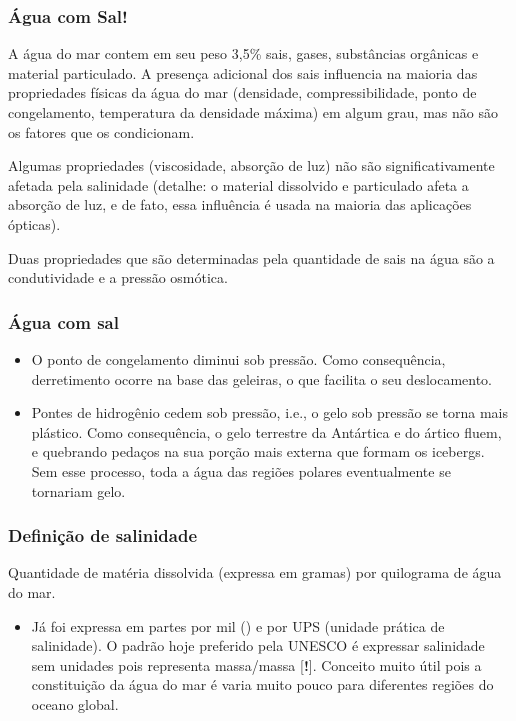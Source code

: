 \begin{frame}
\frametitle{Água com Sal!}
    \small{
    \begin{block}{}
        A água do mar contem em seu peso 3,5\% sais, gases, substâncias
        orgânicas e material particulado.  A presença adicional dos sais
        influencia na maioria das propriedades físicas da água do mar
        (densidade, compressibilidade, ponto de congelamento, temperatura da
        densidade máxima) em algum grau, mas não são os fatores que os
        condicionam.
    \end{block}

    \pause
    \begin{block}{}
        Algumas propriedades (viscosidade, absorção de luz) não são
        significativamente afetada pela salinidade (detalhe: o material
        dissolvido e particulado afeta a absorção de luz, e de fato, essa
        influência é usada na maioria das aplicações ópticas).

        Duas propriedades que são determinadas pela quantidade de sais na água
        são a condutividade e a pressão osmótica.
    \end{block}
    }
\end{frame}

\begin{frame}
\frametitle{Água com sal}
    \small{
    \begin{itemize}[<+-| alert@+>]
    \item O ponto de congelamento diminui sob pressão. Como consequência,
    derretimento ocorre na base das geleiras, o que facilita o seu deslocamento.
    \item Pontes de hidrogênio cedem sob pressão, i.e., o gelo sob pressão se
    torna mais plástico. Como consequência, o gelo terrestre da Antártica e do
    ártico fluem, e quebrando pedaços na sua porção mais externa que formam os
    icebergs. Sem esse processo, toda a água das regiões polares eventualmente se
    tornariam gelo.
    \end{itemize}
    }
\end{frame}

\begin{frame}
\frametitle{Definição de salinidade}
    \small{
    \begin{block}{}
    Quantidade de matéria dissolvida (expressa em gramas) por quilograma de
    água do mar.
    \end{block}
    }
    \pause
    \small{
    \begin{itemize}[<+-| alert@+>]
    \item Já foi expressa em partes por mil (\textperthousand) e por UPS
    (unidade prática de salinidade).  O padrão hoje preferido pela UNESCO é
    expressar salinidade sem unidades pois representa massa/massa [{\bf !}].
    Conceito muito útil pois a constituição da água do mar é varia
    muito pouco para diferentes regiões do oceano global.
    \end{itemize}
    }
\end{frame}

